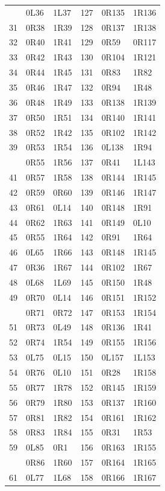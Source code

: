 \begin{longtable}{@{}rll@{\qquad}rll@{}}
\addlinespace[3pt]
30 & 0L36 & 1L37 & 127 & 0R135 & 1R136\\
31 & 0R38 & 1R39 & 128 & 0R137 & 1R138\\
32 & 0R40 & 1R41 & 129 & 0R59 & 0R117\\
33 & 0R42 & 1R43 & 130 & 0R104 & 1R121\\
34 & 0R44 & 1R45 & 131 & 0R83 & 1R82\\
35 & 0R46 & 1R47 & 132 & 0R94 & 1R48\\
36 & 0R48 & 1R49 & 133 & 0R138 & 1R139\\
37 & 0R50 & 1R51 & 134 & 0R140 & 1R141\\
38 & 0R52 & 1R42 & 135 & 0R102 & 1R142\\
39 & 0R53 & 1R54 & 136 & 0L138 & 1R94\\
\addlinespace[3pt]
40 & 0R55 & 1R56 & 137 & 0R41 & 1L143\\
41 & 0R57 & 1R58 & 138 & 0R144 & 1R145\\
42 & 0R59 & 0R60 & 139 & 0R146 & 1R147\\
43 & 0R61 & 0L14 & 140 & 0R148 & 1R91\\
44 & 0R62 & 1R63 & 141 & 0R149 & 0L10\\
45 & 0R55 & 1R64 & 142 & 0R91 & 1R64\\
46 & 0L65 & 1R66 & 143 & 0R148 & 1R145\\
47 & 0R36 & 1R67 & 144 & 0R102 & 1R67\\
48 & 0L68 & 1L69 & 145 & 0R150 & 1R48\\
49 & 0R70 & 0L14 & 146 & 0R151 & 1R152\\
\addlinespace[3pt]
50 & 0R71 & 0R72 & 147 & 0R153 & 1R154\\
51 & 0R73 & 0L49 & 148 & 0R136 & 1R41\\
52 & 0R74 & 1R54 & 149 & 0R155 & 1R156\\
53 & 0L75 & 0L15 & 150 & 0L157 & 1L153\\
54 & 0R76 & 0L10 & 151 & 0R28 & 1R158\\
55 & 0R77 & 1R78 & 152 & 0R145 & 1R159\\
56 & 0R79 & 1R80 & 153 & 0R137 & 1R160\\
57 & 0R81 & 1R82 & 154 & 0R161 & 1R162\\
58 & 0R83 & 1R84 & 155 & 0R31 & 1R53\\
59 & 0L85 & 0R1 & 156 & 0R163 & 1R155\\
\addlinespace[3pt]
60 & 0R86 & 1R60 & 157 & 0R164 & 1R165\\
61 & 0L77 & 1L68 & 158 & 0R166 & 1R167\\

\end{longtable}
